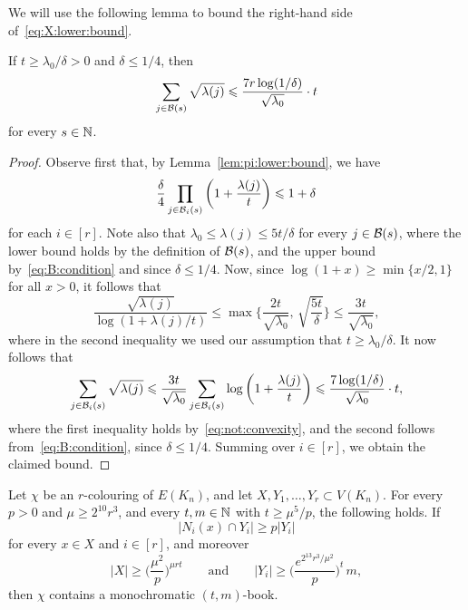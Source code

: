 We will use the following lemma to bound the right-hand side of~\eqref{eq:X:lower:bound}. 

\begin{lemma}\label{lem:sum:of:lambdas}
  If\/ $t \ge \lambda_0 / \delta > 0$ and\/ $\delta \le 1/4$, then
  $$\sum_{j \in \mathcal{B}(s)} \sqrt{\lambda(j)} \leqslant \frac{7r \log(1/\delta)}{\sqrt{\lambda_0}} \cdot t$$
  for every $s \in \mathbb{N}$. 
\end{lemma}

\begin{proof}
  Observe first that, by Lemma~\ref{lem:pi:lower:bound}, we have 
  \begin{equation}\label{eq:B:condition}
  \frac{\delta}{4} \prod_{j \in \mathcal{B}_i(s)} \bigg( 1 + \frac{\lambda(j)}{t} \bigg) \leqslant 1 + \delta
  \end{equation}
  for each $i \in [r]$. Note also that $\lambda_0 \le \lambda(j) \le 5t/\delta$ for every $j \in \mathcal{B}(s)$, where the lower bound holds by the definition of $\mathcal{B}(s)$, and the upper bound by~\eqref{eq:B:condition} and since $\delta \le 1/4$. Now, since $\log(1+x) \ge \min\{ x/2,1\}$ for all $x > 0$, it follows that
  \begin{equation}\label{eq:not:convexity}
  \frac{ \sqrt{\lambda(j)} }{\log(1 + \lambda(j)/t) } \le \max\bigg\{ \frac{ 2t }{ \sqrt{\lambda_0} }, \, \sqrt{ \frac{5t}{\delta}} \bigg\} \le \frac{ 3t }{ \sqrt{\lambda_0} },
  \end{equation}
  where in the second inequality we used %
  our assumption that $t \ge \lambda_0 / \delta$. It now follows that
  $$\sum_{j \in \mathcal{B}_i(s)} \sqrt{\lambda(j)} \leqslant \frac{ 3t }{ \sqrt{\lambda_0} } \sum_{j \in \mathcal{B}_i(s)} \log \bigg( 1 + \frac{\lambda(j)}{t} \bigg) \leqslant \frac{7 \log(1/\delta)}{\sqrt{\lambda_0}} \cdot t,$$
  where the first inequality holds by~\eqref{eq:not:convexity}, and the second follows from~\eqref{eq:B:condition}, since $\delta \le 1/4$. Summing over $i \in [r]$, we obtain the claimed bound. 
\end{proof}


\begin{theorem}\label{thm:book}
  Let\/ $\chi$ be an\/ $r$-colouring of\/ $E(K_n)$, and let\/ $X,Y_1,\ldots,Y_r \subset V(K_n)$. %
  For every $p > 0$ and $\mu \ge 2^{10} r^3$, and every $t,m \in \mathbb{N}$ with $t \ge \mu^5 / p$, the following holds. If 
  $$|N_i(x) \cap Y_i| \ge p|Y_i|$$
  for every $x \in X$ and $i \in [r]$, and moreover
  $$|X| \ge \bigg( \frac{\mu^2}{p} \bigg)^{\mu r t} \qquad \text{and} \qquad |Y_i| \ge \bigg( \frac{e^{2^{13} r^3 / \mu^2}}{p} \bigg)^t \, m,$$ 
  then $\chi$ contains a monochromatic $(t,m)$-book.
\end{theorem}

